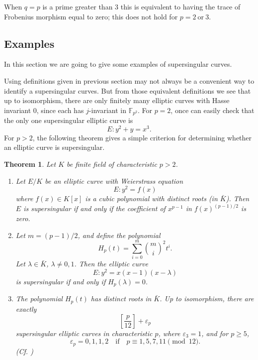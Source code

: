 \documentclass{article}
\theoremstyle{theorem}
\newtheorem{theorem}{Theorem}
\theoremstyle{definition}
\begin{document}
When $q=p$ is a prime greater than 3 this is equivalent to having the trace of Frobenius morphism equal to zero; this does not hold for $p = 2 \ \text{or} \ 3$.

 \subsection{Examples}

In this section we are going to give some examples of supersingular curves.

Using definitions given in previous section may not always be a convenient way to identify a supersingular curves. But from those equivalent definitions we see that up to isomorphism, there are only finitely many elliptic curves with Hasse invariant 0, since each has $j$-invariant in $\mathbb{F}_{p^2}$. For $p = 2$, once can easily check that the only one supersingular elliptic curve is 
	\[ E: y^2 + y = x^3. \]
For $p > 2$, the following theorem gives a simple criterion for determining whether an elliptic curve is supersingular.

\begin{theorem} \label{thm1}
	Let $K$ be finite field of characteristic $p > 2$.
		\begin{enumerate}[label = (\alph*)]
			\item Let $E/K$ be an elliptic curve with Weierstrass equation 
					\[ E: y^2 = f(x) \]
				where $f(x) \in K[x]$ is a cubic polynomial with distinct roots (in $\bar{K}$). Then $E$ is supersingular if and only if the coefficient of $x^{p - 1}$ in $f(x)^{(p - 1)/2}$ is zero.
			
			\item  Let $m = (p - 1)/2$, and define the polynomial
					\[H_p(t) = \sum_{i = 0}^{m} \binom{m}{i}^2t^i. \]
				Let $\lambda \in \bar{K}$, $\lambda \neq 0, 1$. Then the elliptic curve
					\[E: y^2 = x(x - 1)(x - \lambda)  \]
				is supersingular if and only if $H_p(\lambda) = 0$.
			
			\item The polynomial $H_p(t)$ has distinct roots in $\bar{K}$. Up to isomorphism, there are exactly
					\[ [\frac{p}{12}] + \varepsilon_p \]
				supersingular elliptic curves in characteristic $p$, where $\varepsilon_3 = 1$, and for $p \geq 5$,
					\[\varepsilon_p = 0, 1, 1, 2 \quad \textrm{if} \quad p \equiv 1, 5, 7, 11 \pmod{12}. \]
			(Cf. \cite[V, \S4, Theorem 4.1]{Silverman})
		\end{enumerate}
\end{theorem}
\end{document}
